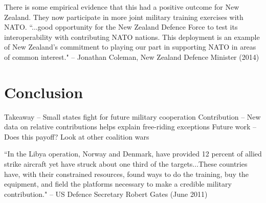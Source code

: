 \documentclass[12pt,letterpaper]{article}
\begin{document}
	There is some empirical evidence that this had a positive outcome for New Zealand. They now participate in more joint military training exercises with NATO. ``...good opportunity for the New Zealand Defence Force to test its interoperability with contributing NATO nations. This deployment is an example of New Zealand's commitment to playing our part in supporting NATO in areas of common interest." -- Jonathan Coleman, New Zealand Defence Minister (2014)

\section{Conclusion}
	Takeaway -- Small states fight for future military cooperation
	Contribution -- New data on relative contributions helps explain free-riding exceptions
	Future work -- Does this payoff? Look at other coalition wars
	
	``In the Libya operation, Norway and Denmark, have provided 12 percent of allied strike aircraft yet have struck about one third of the targets...These countries have, with their constrained resources, found ways to do the training, buy the equipment, and field the platforms necessary to make a credible military contribution." -- US Defence Secretary Robert Gates (June 2011)



\end{document}
